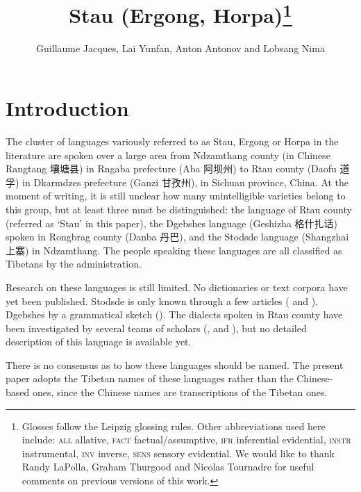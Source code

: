 \documentclass[oneside,a4paper,11pt]{article}
\newcommand{\zh}[1]{{\cn#1}}
\begin{document}
 


\title{Stau (Ergong, Horpa)\footnote{Glosses follow the Leipzig glossing rules. Other abbreviations used here include:   \textsc{all} allative, \textsc{fact} factual/assumptive, \textsc{ifr} inferential evidential, \textsc{instr} instrumental, \textsc{inv} inverse, \textsc{sens} sensory  evidential. We would like to thank Randy LaPolla, Graham Thurgood and Nicolas Tournadre for useful comments on previous versions of this work.}}
\author{Guillaume Jacques, Lai Yunfan, Anton Antonov and Lobsang Nima}

\maketitle
 

\section{Introduction}
The cluster of languages variously referred to as Stau, Ergong or Horpa in the literature are spoken over a large area from Ndzamthang county (in Chinese Rangtang  \zh{壤塘县})  in Rngaba  prefecture (Aba \zh{阿坝州}) to Rtau county (Daofu \zh{道孚}) in Dkarmdzes prefecture (Ganzi \zh{甘孜州}), in Sichuan province, China. At the moment of writing, it is still unclear how many unintelligible varieties belong to this group, but at least three must be distinguished: the language of Rtau county (referred as `Stau' in this paper), the Dgebshes language (Geshizha \zh{格什扎话})  spoken in Rongbrag county (Danba \zh{丹巴}), and the Stodsde language (Shangzhai \zh{上寨}) in Ndzamthang. The people speaking these languages are all classified as Tibetans by the administration.  

Research on these languages is still limited. No dictionaries or text corpora have yet been published. Stodsde is only known through a few articles (\citealt{jackson00sidaba} and   \citealt{jackson07shangzhai}), Dgebshes by a grammatical sketch (\citealt{duoerji98geshizha}). The dialects spoken in Rtau county have been investigated by several teams of scholars (\citealt{huangbf91daofu}, \citealt{sun13gexi} and \citealt{jacques14rtau}), but no detailed description of this language is available yet.

There is no consensus as to how these languages should be named. The present paper adopts the Tibetan names of these languages rather than the Chinese-based ones, since the Chinese names are transcriptions of the Tibetan ones. 
\end{document}
